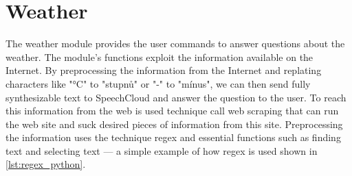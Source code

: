 \section{Weather}

The weather module provides the user commands to answer questions about the weather. The module's functions exploit the information available on the Internet. By preprocessing the information from the Internet and replating characters like "°C" to "stupnů" or "-" to "mínus", we can then send fully synthesizable text to SpeechCloud and answer the question to the user. To reach this information from the web is used technique call web scraping that can run the web site and suck desired pieces of information from this site. Preprocessing the information uses the technique regex and essential functions such as finding text and selecting text — a simple example of how regex is used shown in \cref{lst:regex_python}.

% 


